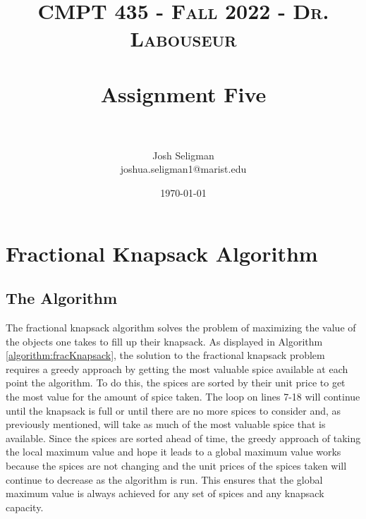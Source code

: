 \documentclass[letterpaper, 10pt,DIV=13]{scrartcl}
\title{	
   \normalfont \normalsize 
   \textsc{CMPT 435 - Fall 2022 - Dr. Labouseur} \\[10pt] %
   \horrule{0.5pt} \\[0.25cm] 	%
   \huge Assignment Five  \\     	    %
   \horrule{0.5pt} \\[0.25cm] 	%
}
\author{Josh Seligman \\ \normalsize joshua.seligman1@marist.edu}
\date{\normalsize\today} 	%
\numberwithin{equation}{section} %
\numberwithin{figure}{section} %
\numberwithin{table}{section} %
\begin{document}
\maketitle %

\section{Fractional Knapsack Algorithm}
\subsection{The Algorithm}
The fractional knapsack algorithm solves the problem of maximizing the value of the objects one takes to fill up their knapsack. As displayed in Algorithm \ref{algorithm:fracKnapsack}, the solution to the fractional knapsack problem requires a greedy approach by getting the most valuable spice available at each point the algorithm. To do this, the spices are sorted by their unit price to get the most value for the amount of spice taken. The loop on lines 7-18 will continue until the knapsack is full or until there are no more spices to consider and, as previously mentioned, will take as much of the most valuable spice that is available. Since the spices are sorted ahead of time, the greedy approach of taking the local maximum value and hope it leads to a global maximum value works because the spices are not changing and the unit prices of the spices taken will continue to decrease as the algorithm is run. This ensures that the global maximum value is always achieved for any set of spices and any knapsack capacity.
\end{document}
